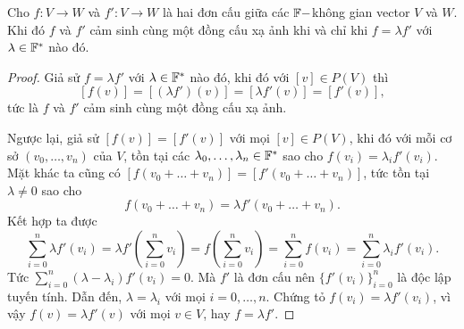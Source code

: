 \begin{prop}
    Cho $f: V \to W$ và $f': V \to W$ là hai đơn cấu giữa các $\mathbb{F}-$không gian vector $V$ và $W$. Khi đó $f$ và $f'$ cảm sinh cùng một đồng cấu xạ ảnh khi và chỉ khi $f = \lambda f'$ với $\lambda \in \mathbb{F}^*$ nào đó.
\end{prop}
\begin{proof}
    Giả sử $f = \lambda f'$ với $\lambda \in \mathbb{F}^*$ nào đó, khi đó với $[v] \in P(V)$ thì \[[f(v)]=[(\lambda f')(v)] = [\lambda f'(v)] = [f'(v)],\]
    tức là $f$ và $f'$ cảm sinh cùng một đồng cấu xạ ảnh.

    Ngược lại, giả sử $[f(v)] = [f'(v)]$ với mọi $[v]\in P(V)$, khi đó với mỗi cơ sở $(v_0,\ldots,v_n)$ của $V$, tồn tại các $\lambda_0,\ldots,\lambda_n \in \mathbb{F}^*$ sao cho $f(v_i) = \lambda_i f'(v_i)$. Mặt khác ta cũng có $[f(v_0+\ldots+v_n)] = [f'(v_0+\ldots+v_n)]$, tức tồn tại $\lambda \neq 0$ sao cho 
    \[f(v_0+\ldots+v_n)=\lambda f'(v_0+\ldots+v_n).\]
    Kết hợp ta được
    \[\sum_{i=0}^n\lambda f'(v_i) = \lambda f'\left(\sum_{i=0}^n v_i\right) = f\left(\sum_{i=0}^n v_i\right) = \sum_{i=0}^n f(v_i) = \sum_{i=0}^n \lambda_i f'(v_i).\]
    Tức $\displaystyle \sum_{i=0}^{n}(\lambda - \lambda_i)f'(v_i) = 0$. Mà $f'$ là đơn cấu nên $\{f'(v_i)\}_{i=0}^{n}$ là độc lập tuyến tính. Dẫn đến, $\lambda = \lambda_i$ với mọi $i =0,\ldots,n$. Chứng tỏ $f(v_i) = \lambda f'(v_i)$, vì vậy $f(v) = \lambda f'(v)$ với mọi $v \in V$, hay $f =\lambda f'$.
\end{proof}
